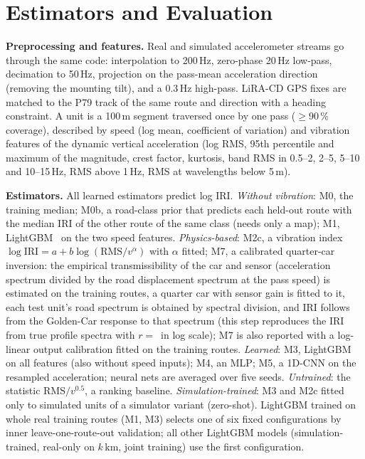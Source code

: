 \section{Estimators and Evaluation}
\label{sec:method}

\textbf{Preprocessing and features.}
Real and simulated accelerometer streams go through the same code: interpolation to 200\,Hz, zero-phase 20\,Hz low-pass, decimation to 50\,Hz, projection on the pass-mean acceleration direction (removing the mounting tilt), and a 0.3\,Hz high-pass.
LiRA-CD GPS fixes are matched to the P79 track of the same route and direction with a heading constraint.
A unit is a 100\,m segment traversed once by one pass ($\ge$90\,\% coverage), described by speed (log mean, coefficient of variation) and vibration features of the dynamic vertical acceleration (log RMS, 95th percentile and maximum of the magnitude, crest factor, kurtosis, band RMS in 0.5--2, 2--5, 5--10 and 10--15\,Hz, RMS above 1\,Hz, RMS at wavelengths below 5\,m).

\textbf{Estimators.}
All learned estimators predict log IRI.
\emph{Without vibration}: M0, the training median; M0b, a road-class prior that predicts each held-out route with the median IRI of the other route of the same class (needs only a map); M1, LightGBM~\cite{ke2017lightgbm} on the two speed features.
\emph{Physics-based}: M2c, a vibration index $\log \mathrm{IRI} = a + b \log(\mathrm{RMS}/v^{\alpha})$ with $\alpha$ fitted; M7, a calibrated quarter-car inversion: the empirical transmissibility of the car and sensor (acceleration spectrum divided by the road displacement spectrum at the pass speed) is estimated on the training routes, a quarter car with sensor gain is fitted to it, each test unit's road spectrum is obtained by spectral division, and IRI follows from the Golden-Car response to that spectrum (this step reproduces the IRI from true profile spectra with $r=$\,\invCheckR{} in log scale); M7 is also reported with a log-linear output calibration fitted on the training routes.
\emph{Learned}: M3, LightGBM on all features (also without speed inputs); M4, an MLP; M5, a 1D-CNN on the resampled acceleration; neural nets are averaged over five seeds.
\emph{Untrained}: the statistic RMS$/v^{0.5}$, a ranking baseline.
\emph{Simulation-trained}: M3 and M2c fitted only to simulated units of a simulator variant (zero-shot). LightGBM trained on whole real training routes (M1, M3) selects one of six fixed configurations by inner leave-one-route-out validation; all other LightGBM models (simulation-trained, real-only on $k$\,km, joint training) use the first configuration.

